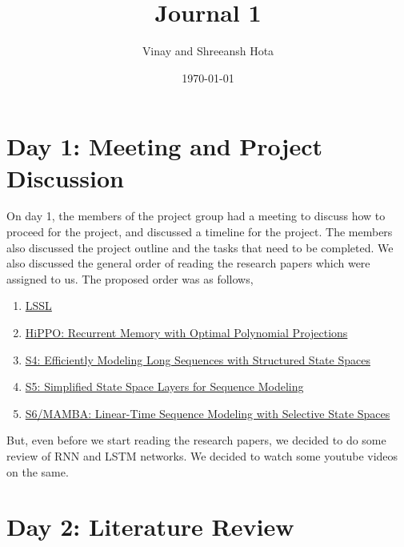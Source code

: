\documentclass[11pt]{scrartcl}
\title{Journal 1}
\author{Vinay and Shreeansh Hota}
\date{\today}
\begin{document}
\maketitle

\tableofcontents

\section{Day 1: Meeting and Project Discussion}

On day 1, the members of the project group had a meeting to discuss how to proceed for the project, and discussed a timeline for the project. The members also discussed the project outline and the tasks that need to be completed. We also discussed the general order of reading the research papers which were assigned to us. The proposed order was as follows,

\begin{enumerate}
    \item \href{https://arxiv.org/pdf/2110.13985}{LSSL}
    \item \href{https://arxiv.org/pdf/2008.07669}{HiPPO: Recurrent Memory with Optimal Polynomial Projections}
    \item \href{https://arxiv.org/pdf/2111.00396}{S4: Efficiently Modeling Long Sequences with Structured State Spaces}
    \item \href{https://arxiv.org/pdf/2208.04933}{S5: Simplified State Space Layers for Sequence Modeling}
    \item \href{https://arxiv.org/pdf/2312.00752}{S6/MAMBA: Linear-Time Sequence Modeling with Selective State Spaces}
\end{enumerate}

But, even before we start reading the research papers, we decided to do some review of RNN and LSTM networks. We decided to watch some youtube videos on the same.

\section{Day 2: Literature Review}
\end{document}

